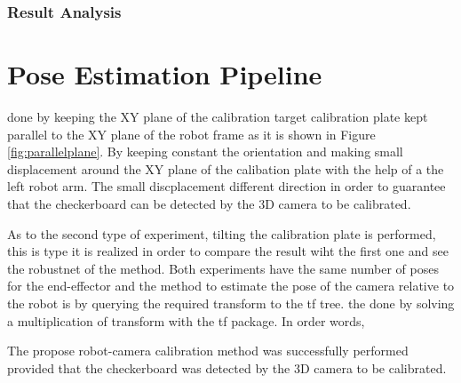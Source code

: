 \subsubsection{Result Analysis}

















\section{Pose Estimation Pipeline}
\iffalse







done by keeping the XY plane of the calibration target calibration plate kept parallel to the XY plane of the robot frame as it is shown in Figure \ref{fig:parallelplane}. By keeping constant the orientation and making small displacement around the XY plane of the calibation plate with the help of a the left robot arm. The small discplacement  different direction in order to guarantee that the checkerboard can be detected by the 3D camera to be calibrated. 

As to the second type of experiment, tilting the calibration plate is performed, this is type it is realized in order to compare the result wiht the first one and see the robustnet of the method. 
Both experiments have the same number of poses for the end-effector and the method to estimate the pose of the camera relative to the robot is by querying the required transform to the tf tree.  the done by solving a multiplication of transform with the tf package. In order words, 





The propose robot-camera calibration method was successfully performed provided that the checkerboard was detected by the 3D camera to be calibrated.


